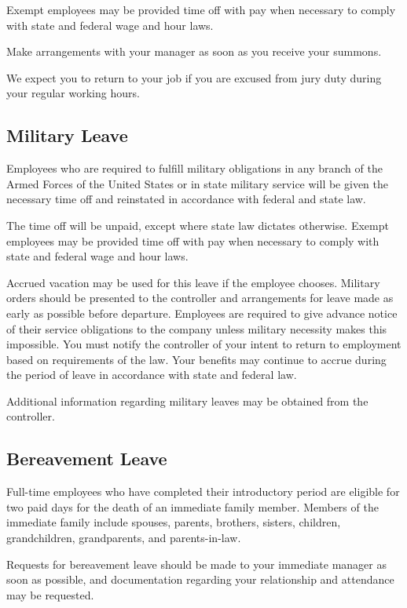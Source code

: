 \documentclass{book}
\begin{document}
Exempt employees may be provided time off with pay when necessary to comply with state and federal wage and hour laws.

Make arrangements with your manager as soon as you receive your summons.

We expect you to return to your job if you are excused from jury duty during your regular working hours.

\subsection{Military Leave}

Employees who are required to fulfill military obligations in any branch of the Armed Forces of the United States or in state military service will be given the necessary time off and reinstated in accordance with federal and state law.

The time off will be unpaid, except where state law dictates otherwise. Exempt employees may be provided time off with pay when necessary to comply with state and federal wage and hour laws.

Accrued vacation may be used for this leave if the employee chooses. Military orders should be presented to the controller and arrangements for leave made as early as possible before departure. Employees are required to give advance notice of their service obligations to the company unless military necessity makes this impossible. You must notify the controller of your intent to return to employment based on requirements of the law. Your benefits may continue to accrue during the period of leave in accordance with state and federal law.

Additional information regarding military leaves may be obtained from the controller.

\subsection{Bereavement Leave}

Full-time employees who have completed their introductory period are eligible for two paid days for the death of an immediate family member. Members of the immediate family include spouses, parents, brothers, sisters, children, grandchildren, grandparents, and parents-in-law.

Requests for bereavement leave should be made to your immediate manager as soon as possible, and documentation regarding your relationship and attendance may be requested.
\end{document}
